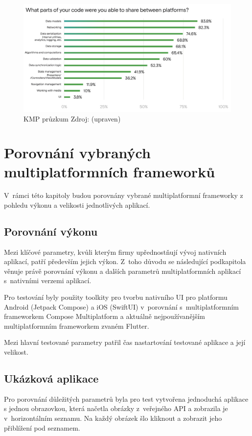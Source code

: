 \begin{figure}[H]
  \centering
  \includegraphics[width=1\textwidth]{survey-results-q1-q2-22-light.jpg}
  \caption{KMP průzkum Zdroj: \cite{imgSurvey} (upraven)}
  \label{fig:KMPSurvey}
\end{figure}

\section{Porovnání vybraných multiplatformních frameworků}

V~rámci této kapitoly budou porovnány vybrané multiplatformní frameworky z pohledu výkonu a velikosti jednotlivých aplikací.


\subsection{Porovnání výkonu} \label{performanceSection}

Mezi klíčové parametry, kvůli kterým firmy upřednostňují vývoj nativních aplikací, patří především jejich výkon. Z~toho důvodu se následující podkapitola věnuje právě porovnání výkonu a dalších parametrů multiplatformních aplikací
s~nativními verzemi aplikací. 

Pro testování byly použity toolkity pro tvorbu nativního UI pro platformu Android (Jetpack Compose) a iOS (SwiftUI)
v~porovnání s~multiplatformním frameworkem Compose Multiplatform a aktuálně nejpoužívanějším multiplatformním
frameworkem zvaném Flutter. \cite{crossPlatformFrameworksStats} 

Mezi hlavní testované parametry patřil čas nastartování testované aplikace a její velikost.

\subsection*{Ukázková aplikace}
Pro porovnání důležitých parametrů byla pro test vytvořena jednoduchá aplikace s jednou obrazovkou, která 
načetla obrázky z~veřejného API a zobrazila je v~horizontálním seznamu. 
Na každý obrázek šlo kliknout a zobrazit jeho přiblížení pod seznamem. 

